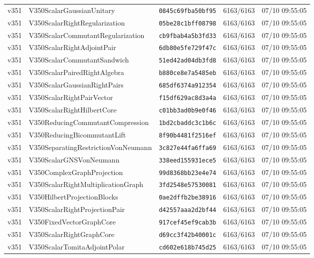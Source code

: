 \documentclass[11pt]{article}
\theoremstyle{definition}\newtheorem{deriv}{Derivação}
\begin{document}
{\begin{longtable}{@{}lllll@{}}
v351 & V350ScalarGaussianUnitary & \texttt{0845c69fba50bf95} & 6163/6163 & 07/10 09:55:05 \\
v351 & V350ScalarRightRegularization & \texttt{05be28c1bff08798} & 6163/6163 & 07/10 09:55:05 \\
v351 & V350ScalarCommutantRegularization & \texttt{cb9fbab4a5b3fd33} & 6163/6163 & 07/10 09:55:05 \\
v351 & V350ScalarRightAdjointPair & \texttt{6db80e5fe729f47c} & 6163/6163 & 07/10 09:55:05 \\
v351 & V350ScalarCommutantSandwich & \texttt{51ed42ad04db3fd8} & 6163/6163 & 07/10 09:55:05 \\
v351 & V350ScalarPairedRightAlgebra & \texttt{b880ce8e7a5485eb} & 6163/6163 & 07/10 09:55:05 \\
v351 & V350ScalarGaussianRightPairs & \texttt{685df6374a912354} & 6163/6163 & 07/10 09:55:05 \\
v351 & V350ScalarRightPairVector & \texttt{f15df629ac8d3a4a} & 6163/6163 & 07/10 09:55:05 \\
v351 & V350ScalarRightHilbertCore & \texttt{c01bb3ad0b9e0f46} & 6163/6163 & 07/10 09:55:05 \\
v351 & V350ReducingCommutantCompression & \texttt{1bd2cbaddc3c1b6c} & 6163/6163 & 07/10 09:55:05 \\
v351 & V350ReducingBicommutantLift & \texttt{8f90b4481f2516ef} & 6163/6163 & 07/10 09:55:05 \\
v351 & V350SeparatingRestrictionVonNeumann & \texttt{3c827e44fa6ffa69} & 6163/6163 & 07/10 09:55:05 \\
v351 & V350ScalarGNSVonNeumann & \texttt{338eed155931ece5} & 6163/6163 & 07/10 09:55:05 \\
v351 & V350ComplexGraphProjection & \texttt{99d8368bb23e4e74} & 6163/6163 & 07/10 09:55:05 \\
v351 & V350ScalarRightMultiplicationGraph & \texttt{3fd2548e57530081} & 6163/6163 & 07/10 09:55:05 \\
v351 & V350HilbertProjectionBlocks & \texttt{0ae2dffb2be38916} & 6163/6163 & 07/10 09:55:05 \\
v351 & V350ScalarRightProjectionPair & \texttt{d42557aaa2d2bf44} & 6163/6163 & 07/10 09:55:05 \\
v351 & V350FixedVectorGraphCore & \texttt{917cef45ef9cab3b} & 6163/6163 & 07/10 09:55:05 \\
v351 & V350ScalarRightGraphCore & \texttt{d69cc3f42b40001c} & 6163/6163 & 07/10 09:55:05 \\
v351 & V350ScalarTomitaAdjointPolar & \texttt{cd602e618b745d25} & 6163/6163 & 07/10 09:55:05 \\

\end{longtable}}
\end{document}

